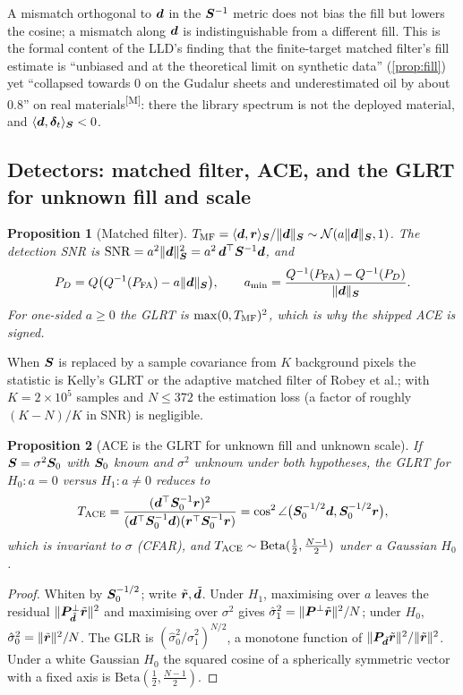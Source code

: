\documentclass[11pt,a4paper]{article}
\theoremstyle{plain}
\newtheorem{proposition}{Proposition}[section]
\theoremstyle{definition}
\theoremstyle{remark}
\newcommand{\rv}{\B{r}}
\newcommand{\dv}{\B{d}}
\newcommand{\Sm}{\B{S}}
\newcommand{\Pm}{\B{P}}
\newcommand{\ip}[2]{\langle #1,#2\rangle_{\Sm}}
\newcommand{\nrm}[1]{\lVert #1\rVert}
\newcommand{\meas}{\textsuperscript{\textsf{\scriptsize[M]}}}
\begin{document}
A mismatch orthogonal to $\dv$ in the $\Sm^{-1}$ metric does not bias the fill but lowers the cosine; a mismatch
along $\dv$ is indistinguishable from a different fill. This is the formal content of the LLD's finding that the
finite-target matched filter's fill estimate is ``unbiased and at the theoretical limit on synthetic data''
(\cref{prop:fill}) yet ``collapsed towards 0 on the Gudalur sheets and underestimated oil by about 0.8'' on real
materials\meas: there the library spectrum is not the deployed material, and $\ip{\dv}{\B\delta_t}<0$.

\subsection{Detectors: matched filter, ACE, and the GLRT for unknown fill and scale}

\begin{proposition}[Matched filter]
\label{prop:mf}
$T_{\rm MF}=\ip{\dv}{\rv}/\nrm{\dv}_{\Sm}\sim\mathcal N(a\nrm{\dv}_{\Sm},1)$. The detection SNR is
$\mathrm{SNR}=a^2\nrm{\dv}^2_{\Sm}=a^2\,\dv^\top\Sm^{-1}\dv$, and
\[
  P_D=Q\big(Q^{-1}(P_{\rm FA})-a\nrm{\dv}_{\Sm}\big),\qquad
  a_{\min}=\frac{Q^{-1}(P_{\rm FA})-Q^{-1}(P_D)}{\nrm{\dv}_{\Sm}} .
\]
For one-sided $a\ge0$ the GLRT is $\max(0,T_{\rm MF})^2$, which is why the shipped ACE is signed.
\end{proposition}

When $\Sm$ is replaced by a sample covariance from $K$ background pixels the statistic is Kelly's GLRT or the
adaptive matched filter of Robey et al.; with $K=2\times10^5$ samples and $N\le372$ the estimation loss
(a factor of roughly $(K-N)/K$ in SNR) is negligible.

\begin{proposition}[ACE is the GLRT for unknown fill and unknown scale]
\label{prop:ace}
If $\Sm=\sigma^2\Sm_0$ with $\Sm_0$ known and $\sigma^2$ unknown under both hypotheses, the GLRT for
$H_0:a=0$ versus $H_1:a\neq0$ reduces to
\[
  T_{\rm ACE}=\frac{(\dv^\top\Sm_0^{-1}\rv)^2}{(\dv^\top\Sm_0^{-1}\dv)(\rv^\top\Sm_0^{-1}\rv)}=\cos^2\angle\big(\Sm_0^{-1/2}\dv,\Sm_0^{-1/2}\rv\big),
\]
which is invariant to $\sigma$ (CFAR), and $T_{\rm ACE}\sim\mathrm{Beta}(\tfrac12,\tfrac{N-1}{2})$ under a Gaussian
$H_0$ \cite{KrautScharf1999}.
\end{proposition}
\begin{proof}
Whiten by $\Sm_0^{-1/2}$; write $\tilde{\rv},\tilde{\dv}$. Under $H_1$, maximising over $a$ leaves the residual
$\nrm{\Pm^\perp_{\tilde{\dv}}\tilde{\rv}}^2$ and maximising over $\sigma^2$ gives $\hat{\sigma}^2_1=\nrm{\Pm^\perp\tilde{\rv}}^2/N$;
under $H_0$, $\hat{\sigma}^2_0=\nrm{\tilde{\rv}}^2/N$. The GLR is $(\hat{\sigma}^2_0/\hat{\sigma}^2_1)^{N/2}$, a monotone
function of $\nrm{\Pm_{\tilde{\dv}}\tilde{\rv}}^2/\nrm{\tilde{\rv}}^2$. Under a white Gaussian $H_0$ the squared cosine of a
spherically symmetric vector with a fixed axis is $\mathrm{Beta}(\tfrac12,\tfrac{N-1}2)$.
\end{proof}
\end{document}
